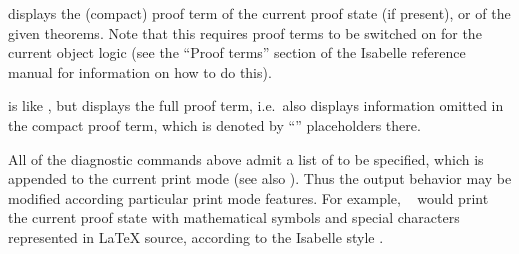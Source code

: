 \begin{isabellebody}
\begin{isamarkuptext}
\begin{descr}
  \item [\hyperlink{command.prf}{\mbox{\isa{\isacommand{prf}}}}] displays the (compact) proof term of the
  current proof state (if present), or of the given theorems. Note
  that this requires proof terms to be switched on for the current
  object logic (see the ``Proof terms'' section of the Isabelle
  reference manual for information on how to do this).

  \item [\hyperlink{command.full-prf}{\mbox{\isa{\isacommand{full{\isacharunderscore}prf}}}}] is like \hyperlink{command.prf}{\mbox{}}, but displays
  the full proof term, i.e.\ also displays information omitted in the
  compact proof term, which is denoted by ``\isa{{\isacharunderscore}}'' placeholders
  there.

  \end{descr}

  All of the diagnostic commands above admit a list of 
  to be specified, which is appended to the current print mode (see
  also \cite{isabelle-ref}).  Thus the output behavior may be modified
  according particular print mode features.  For example, \hyperlink{command.pr}{\mbox{}}~ would print the current
  proof state with mathematical symbols and special characters
  represented in {\LaTeX} source, according to the Isabelle style
  \cite{isabelle-sys}.


\end{isamarkuptext}
\end{isabellebody}

